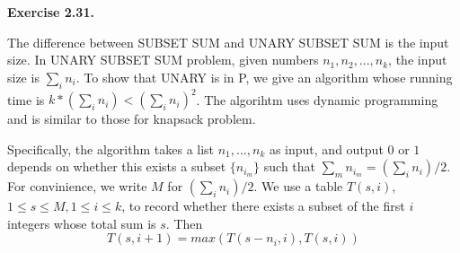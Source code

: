 \documentclass[a4paper]{article}
\newenvironment{exercise}[1]{
	\par
	\noindent\textbf{Exercise #1.}\quad
}{
	\par
	\bigskip
}
\begin{document}
\begin{exercise}{2.31}
The difference between SUBSET SUM and UNARY SUBSET SUM is the input size. In UNARY SUBSET SUM problem, given numbers $n_1,n_2,...,n_k$, the input size is $\sum_i n_i$. To show that UNARY is in P, we give an algorithm whose running time is $k*(\sum_i n_i)<(\sum_i n_i)^2$. The algorihtm uses dynamic programming and is
similar to those for knapsack problem.

Specifically, the algorithm takes a list $n_1,...,n_k$ as input, and output $0$ or $1$ depends on whether this exists a subset $\{n_{i_{m}}\}$ such that $\sum_m n_{i_m}=(\sum_i n_i)/2$. For convinience, we write $M$ for $(\sum_i n_i)/2$. We use a table $T(s,i)$, $1\leq s\leq M, 1\leq i\leq k$, to record whether there exists a subset of the first $i$ integers whose total sum is $s$. Then
$$
T(s,i+1)=max(T(s-n_i,i), T(s,i))
$$
\end{exercise}
\end{document}

